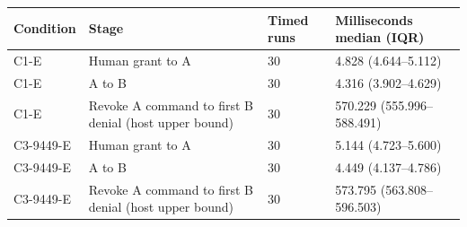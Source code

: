 \begin{tabular}{llll}
\hline
Condition & Stage & Timed runs & Milliseconds median (IQR) \\
\hline
C1-E & Human grant to A & 30 & 4.828 (4.644--5.112) \\
C1-E & A to B & 30 & 4.316 (3.902--4.629) \\
C1-E & Revoke A command to first B denial (host upper bound) & 30 & 570.229 (555.996--588.491) \\
C3-9449-E & Human grant to A & 30 & 5.144 (4.723--5.600) \\
C3-9449-E & A to B & 30 & 4.449 (4.137--4.786) \\
C3-9449-E & Revoke A command to first B denial (host upper bound) & 30 & 573.795 (563.808--596.503) \\
\hline
\end{tabular}

